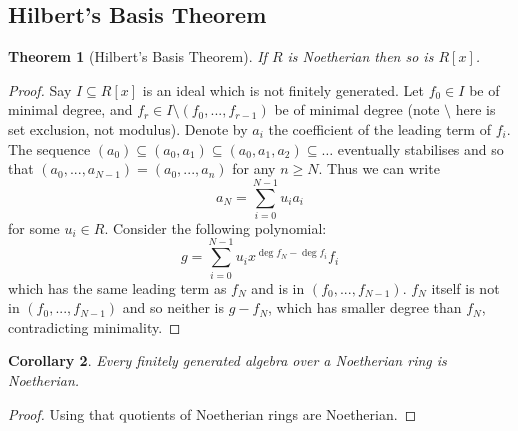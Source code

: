 \documentclass[12pt]{article}
\theoremstyle{plain}
\newtheorem{thm}{Theorem}[subsection] %
\newtheorem{cor}[thm]{Corollary}
\theoremstyle{definition}
\begin{document}
	\subsection{Hilbert's Basis Theorem}
	\begin{thm}[Hilbert's Basis Theorem]
		If $R$ is Noetherian then so is $R[x]$.
	\end{thm}
	\begin{proof}
		Say $I \subseteq R[x]$ is an ideal which is not finitely generated. Let $f_0 \in I$ be of minimal degree, and $f_r \in I\setminus(f_0,...,f_{r-1})$ be of minimal degree (note $\setminus$ here is set exclusion, not modulus). Denote by $a_i$ the coefficient of the leading term of $f_i$. The sequence $(a_0) \subseteq (a_0,a_1) \subseteq (a_0,a_1,a_2) \subseteq \hdots$ eventually stabilises and so that $(a_0,...,a_{N-1}) = (a_0,...,a_n)$ for any $n \geq N$. Thus we can write
		\[a_N = \sum_{i = 0}^{N-1}u_i a_i\]
		for some $u_i \in R$. Consider the following polynomial:
		\[g = \sum_{i = 0}^{N-1}u_ix^{\operatorname{deg}f_N - \operatorname{deg}f_i}f_i\]
		which has the same leading term as $f_N$ and is in $(f_0,...,f_{N-1})$. $f_N$ itself is not in $(f_0,...,f_{N-1})$ and so neither is $g - f_{N}$, which has smaller degree than $f_{N}$, contradicting minimality.
	\end{proof}
	\begin{cor}
		Every finitely generated algebra over a Noetherian ring is Noetherian.
	\end{cor}
	\begin{proof}
		Using that quotients of Noetherian rings are Noetherian.
	\end{proof}
\end{document}
